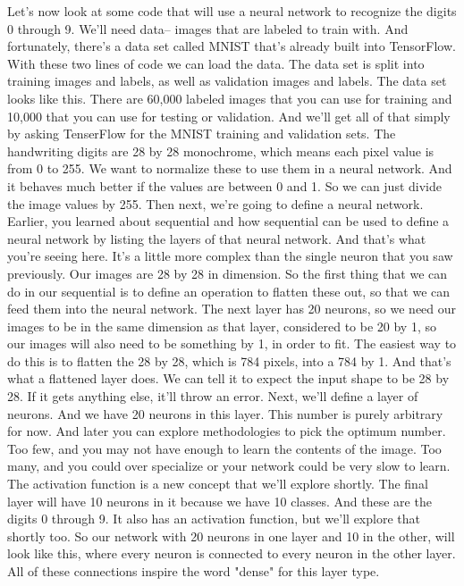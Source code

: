 Let's now look at some code that will use a neural network
to recognize the digits 0 through 9.
We'll need data-- images that are labeled to train with.
And fortunately, there's a data set called MNIST
that's already built into TensorFlow.
With these two lines of code we can load the data.
The data set is split into training images and labels, as well as
validation images and labels.
The data set looks like this.
There are 60,000 labeled images that you can use for training and 10,000
that you can use for testing or validation.
And we'll get all of that simply by asking
TenserFlow for the MNIST training and validation sets.
The handwriting digits are 28 by 28 monochrome, which means
each pixel value is from 0 to 255.
We want to normalize these to use them in a neural network.
And it behaves much better if the values are between 0 and 1.
So we can just divide the image values by 255.
Then next, we're going to define a neural network.
Earlier, you learned about sequential and how
sequential can be used to define a neural network by listing
the layers of that neural network.
And that's what you're seeing here.
It's a little more complex than the single neuron that you saw previously.
Our images are 28 by 28 in dimension.
So the first thing that we can do in our sequential
is to define an operation to flatten these out,
so that we can feed them into the neural network.
The next layer has 20 neurons, so we need our images
to be in the same dimension as that layer, considered
to be 20 by 1, so our images will also need to be something by 1,
in order to fit.
The easiest way to do this is to flatten the 28 by 28, which is 784 pixels,
into a 784 by 1.
And that's what a flattened layer does.
We can tell it to expect the input shape to be 28 by 28.
If it gets anything else, it'll throw an error.
Next, we'll define a layer of neurons.
And we have 20 neurons in this layer.
This number is purely arbitrary for now.
And later you can explore methodologies to pick the optimum number.
Too few, and you may not have enough to learn the contents of the image.
Too many, and you could over specialize or your network
could be very slow to learn.
The activation function is a new concept that we'll explore shortly.
The final layer will have 10 neurons in it because we have 10 classes.
And these are the digits 0 through 9.
It also has an activation function, but we'll explore that shortly too.
So our network with 20 neurons in one layer and 10 in the other,
will look like this, where every neuron is connected
to every neuron in the other layer.
All of these connections inspire the word "dense" for this layer type.
